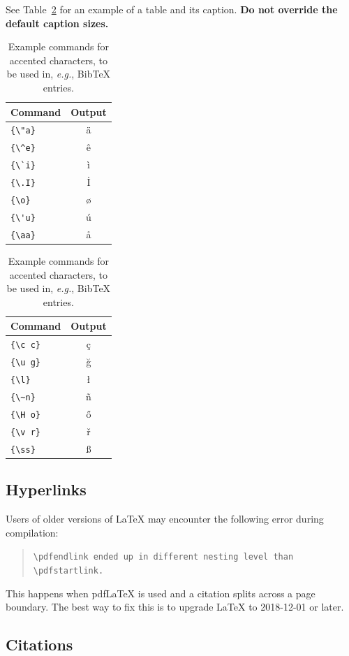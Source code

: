 \documentclass[11pt]{article}
\begin{document}
 See Table~\ref{tab:accents} for an example of a table and its caption.
 \textbf{Do not override the default caption sizes.}

 \begin{table}
 \centering
 \begin{tabular}{lc}
 \hline
 \textbf{Command} & \textbf{Output}\\
 \hline
 \verb|{\"a}| & {\"a} \\
 \verb|{\^e}| & {\^e} \\
 \verb|{\`i}| & {\`i} \\ 
 \verb|{\.I}| & {\.I} \\ 
 \verb|{\o}| & {\o} \\
 \verb|{\'u}| & {\'u}  \\ 
 \verb|{\aa}| & {\aa}  \\\hline
 \end{tabular}
 \begin{tabular}{lc}
 \hline
 \textbf{Command} & \textbf{Output}\\
 \hline
 \verb|{\c c}| & {\c c} \\ 
 \verb|{\u g}| & {\u g} \\ 
 \verb|{\l}| & {\l} \\ 
 \verb|{\~n}| & {\~n} \\ 
 \verb|{\H o}| & {\H o} \\ 
 \verb|{\v r}| & {\v r} \\ 
 \verb|{\ss}| & {\ss} \\
 \hline
 \end{tabular}
 \caption{Example commands for accented characters, to be used in, \emph{e.g.}, Bib\TeX{} entries.}
 \label{tab:accents}
 \end{table}

 \subsection{Hyperlinks}

 Users of older versions of \LaTeX{} may encounter the following error during compilation: 
 \begin{quote}
 \tt\verb|\pdfendlink| ended up in different nesting level than \verb|\pdfstartlink|.
 \end{quote}
 This happens when pdf\LaTeX{} is used and a citation splits across a page boundary. The best way to fix this is to upgrade \LaTeX{} to 2018-12-01 or later.

 \subsection{Citations}
\end{document}
